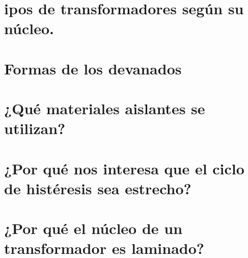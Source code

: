 \documentclass{report}
\begin{document}
\section{ipos de transformadores según su núcleo.}

\section{Formas de los devanados}

\section{¿Qué materiales aislantes se utilizan?}

\section{¿Por qué nos interesa que el ciclo de histéresis sea estrecho?}

\section{¿Por qué el núcleo de un transformador es laminado?}
\end{document}
